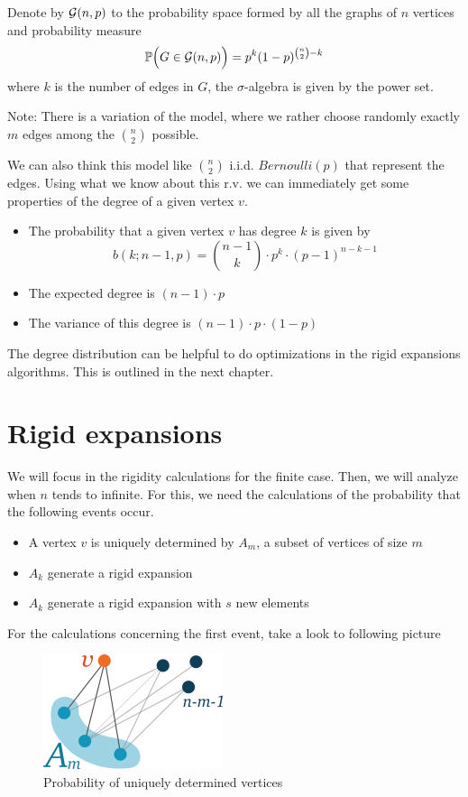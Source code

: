 \begin{defini}
Denote by $\mathcal{G}(n,p)$ to the probability space formed by all the graphs of $n$ vertices and probability measure 
$$ \mathbb{P}\Big(G\in \mathcal{G}(n,p)\Big) = p^{k} (1-p)^{\binom{n}{2}-k} $$
where $k$ is the number of edges in $G$, the $\sigma$-algebra is given by the power set.
\end{defini}

Note: There is a variation of the model, where we rather choose randomly exactly $m$ edges among the $\binom{n}{2}$ possible.

We can also think this model like $\binom{n}{2}$ i.i.d. $Bernoulli(p)$ that represent the edges. Using what we know about this r.v. we can immediately get some properties of the degree of a given vertex $v$.

\begin{itemize}
\item The probability that a given vertex $v$ has degree $k$ is given by
$$b(k; n-1,p) = \binom{n-1}{k} \cdot p^{k} \cdot (p-1)^{n-k-1}$$
\item The expected degree is $(n-1)\cdot p$
\item The variance of this degree is $(n-1)\cdot p \cdot (1-p)$
\end{itemize}

The degree distribution can be helpful to do optimizations in the rigid expansions algorithms. This is outlined in the next chapter.

\section{Rigid expansions}

 We will focus in the rigidity calculations for the finite case. Then, we will analyze when $n$ tends to infinite. For this, we need the calculations of the probability that the following events occur.

\begin{itemize}
\item A vertex $v$ is uniquely determined by $A_{m}$, a subset of vertices of size $m$
\item $A_k$ generate a rigid expansion
\item $A_k$ generate a rigid expansion with $s$ new elements
\end{itemize}

For the calculations concerning the first event, take a look to following picture

\begin{figure}[h!]
	\centering
	\includegraphics[scale=1]{Figures/uni.png}
	\caption{Probability of uniquely determined vertices}
\end{figure}

